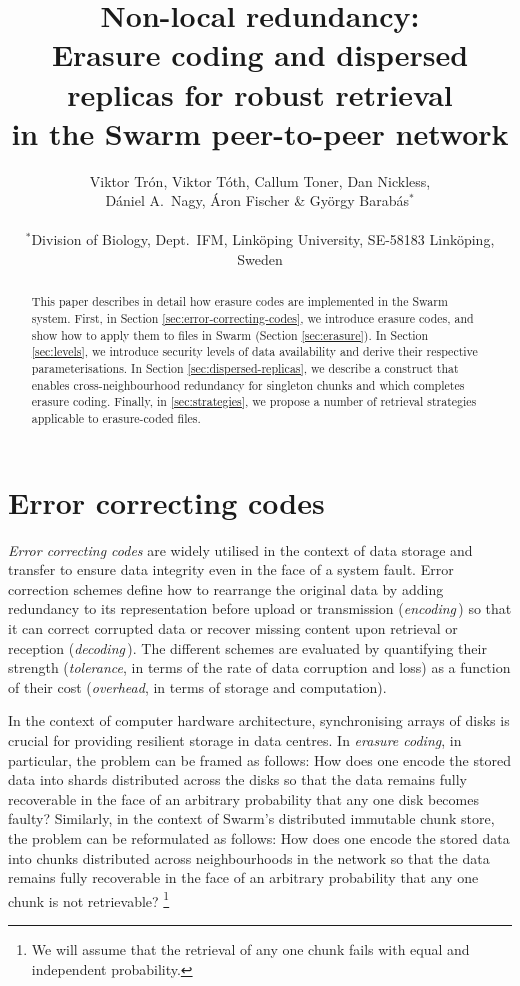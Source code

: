 \documentclass[a4paper,11pt]{article}
\title{Non-local redundancy:\\Erasure coding and dispersed replicas for robust retrieval\\in the Swarm peer-to-peer network}
\author{Viktor Trón, Viktor Tóth, Callum Toner, Dan Nickless,\\ Dániel A.~Nagy, Áron Fischer \& György Barabás$^\ast$\\
\\
$^\ast$\small{Division of Biology, Dept.~IFM, Link\"oping University, SE-58183 Link\"oping, Sweden}
}
\date{}
\begin{document}
\maketitle

\vspace{1cm}

\begin{abstract}
\noindent This paper describes in detail how erasure codes are implemented in the Swarm system. First, in Section \ref{sec:error-correcting-codes}, we introduce erasure codes, and show how to apply them to files in Swarm (Section \ref{sec:erasure}). In Section  
\ref{sec:levels}, we introduce security levels of data availability and derive their respective parameterisations. In Section \ref{sec:dispersed-replicas}, we describe a construct that enables cross-neighbourhood redundancy for singleton chunks and which completes erasure coding. Finally, in \ref{sec:strategies}, we propose a number of retrieval strategies applicable to erasure-coded files.

\vspace{1cm}

{\small
\tableofcontents
}
\end{abstract}
\newpage

\section{Error correcting codes}\label{sec:error-correcting-codes}
%

\emph{Error correcting codes} are widely utilised in the context of data storage and transfer to ensure data integrity even in the face of a system fault. Error correction schemes define how to rearrange the original data by adding redundancy to its representation before upload or transmission (\emph{encoding}\,) so that it can correct corrupted data or recover missing content upon retrieval or reception (\emph{decoding}\,). The different schemes are evaluated by quantifying their strength (\emph{tolerance}, in terms of the rate of data corruption and loss) as a function of their cost (\emph{overhead}, in terms of storage and computation).

In the context of  computer hardware architecture, synchronising arrays of disks is crucial for providing resilient storage in data centres.
In \emph{erasure coding}, %
%
%
in particular, the problem can be framed as follows: How does one encode the stored data into shards distributed across the disks so that the data remains fully recoverable in the face of an arbitrary probability that any one disk becomes faulty?
Similarly, in the context of Swarm's distributed immutable chunk store, the problem can be reformulated as follows: How does one encode the stored data into chunks distributed across neighbourhoods in the network so that the data remains fully recoverable in the face of an arbitrary probability that any one chunk is not retrievable?%
%
\footnote{%
We will assume that the retrieval of any one chunk fails with equal and independent probability.}
\end{document}
